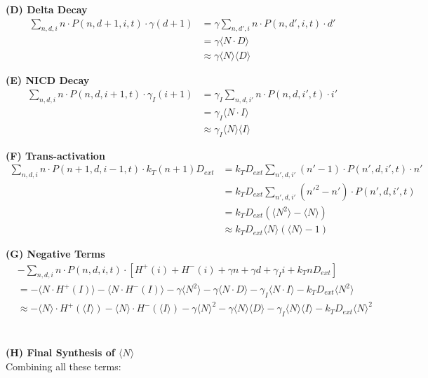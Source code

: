 \documentclass{article}
\begin{document}
\begin{flushleft}
\textbf{(D) Delta Decay}
\begin{align*}
\sum_{n,d,i} n \cdot P(n,d+1,i,t) \cdot \gamma(d+1) &= \gamma \sum_{n,d',i} n \cdot P(n,d',i,t) \cdot d' \\
&= \gamma \langle N \cdot D \rangle \\
&\approx \gamma \langle N \rangle \langle D \rangle
\end{align*}

\textbf{(E) NICD Decay}
\begin{align*}
\sum_{n,d,i} n \cdot P(n,d,i+1,t) \cdot \gamma_I(i+1) &= \gamma_I \sum_{n,d,i'} n \cdot P(n,d,i',t) \cdot i' \\
&= \gamma_I \langle N \cdot I \rangle \\
&\approx \gamma_I \langle N \rangle \langle I \rangle
\end{align*}

\textbf{(F) Trans-activation}
\begin{align*}
\sum_{n,d,i} n \cdot P(n+1,d,i-1,t) \cdot k_T(n+1)D_{ext} &= k_T D_{ext} \sum_{n',d,i'} (n'-1) \cdot P(n',d,i',t) \cdot n' \\
&= k_T D_{ext} \sum_{n',d,i'} (n'^2 - n') \cdot P(n',d,i',t) \\
&= k_T D_{ext} (\langle N^2 \rangle - \langle N \rangle) \\
&\approx k_T D_{ext} \langle N \rangle (\langle N \rangle - 1)
\end{align*}

\textbf{(G) Negative Terms}
\begin{align*}
&-\sum_{n,d,i} n \cdot P(n,d,i,t) \cdot [H^+(i) + H^-(i) + \gamma n + \gamma d + \gamma_I i + k_T n D_{ext}] \\
&= -\langle N \cdot H^+(I) \rangle - \langle N \cdot H^-(I) \rangle - \gamma \langle N^2 \rangle - \gamma \langle N \cdot D \rangle - \gamma_I \langle N \cdot I \rangle - k_T D_{ext} \langle N^2 \rangle \\
&\approx -\langle N \rangle \cdot H^+(\langle I \rangle) - \langle N \rangle \cdot H^-(\langle I \rangle) - \gamma \langle N \rangle^2 - \gamma \langle N \rangle \langle D \rangle - \gamma_I \langle N \rangle
\langle I \rangle - k_T D_{ext} \langle N \rangle^2
\end{align*} \\~\\

\textbf{(H) Final Synthesis of $\langle N \rangle$}\\

Combining all these terms:


\end{flushleft}
\end{document}
